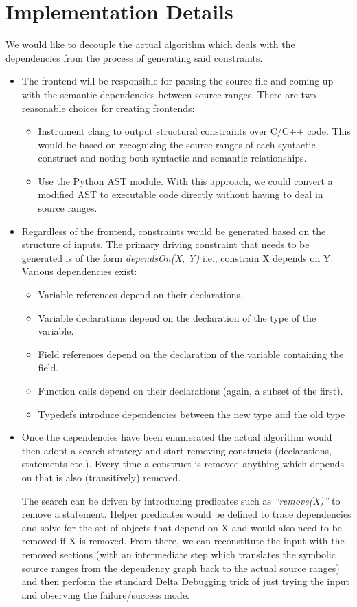 \documentclass[11pt]{article}
\begin{document}
\section{Implementation Details}
We would like to decouple the actual algorithm which deals with the dependencies
from the process of generating said constraints. 
\begin{itemize}
\item{The frontend will be responsible for parsing the source file and coming up with
the semantic dependencies between source ranges. There are two reasonable
choices for creating frontends:}
\begin{itemize}
\item{Instrument clang to output structural constraints over C/C++ code. This
  would be based on recognizing the source ranges of each syntactic construct
  and noting both syntactic and semantic relationships.}
\item{Use the Python AST module. With this approach, we could convert a modified
  AST to executable code directly without having to deal in source ranges.}
\end{itemize}
\item Regardless of the frontend, constraints would be generated based on the
structure of inputs. The primary driving constraint that needs to be generated
is of the form \emph{dependsOn(X, Y)} i.e., constrain X depends on Y. Various
dependencies exist:
\begin{itemize}
\item{Variable references depend on their declarations.}
\item{Variable declarations depend on the declaration of the type of the variable.}
\item{Field references depend on the declaration of the variable containing the field.}
\item{Function calls depend on their declarations (again, a subset of the first).}
\item{Typedefs introduce dependencies between the new type and the old type}
\end{itemize}
\item Once the dependencies have been enumerated the actual algorithm would then
  adopt a search strategy and start removing constructs (declarations,
  statements etc.). Every time a construct is removed anything which depends on
  that is also (transitively) removed.  

The search can be driven by introducing predicates such as \emph{``remove(X)''}
to remove a statement. Helper predicates would be defined to trace dependencies
and solve for the set of objects that depend on X and would also need to be
removed if X is removed. From there, we can reconstitute the input with the
removed sections (with an intermediate step which translates the symbolic source
ranges from the dependency graph back to the actual source ranges) and then
perform the standard Delta Debugging trick of just trying the input and
observing the failure/success mode.
\end{itemize}
\end{document}
